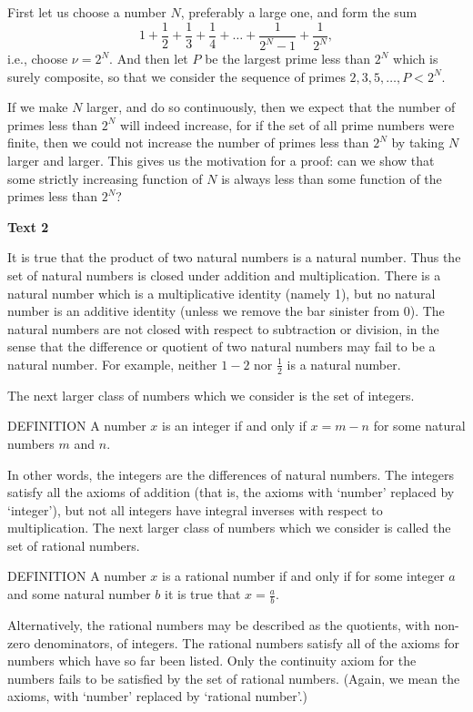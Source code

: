 \documentclass[a4paper]{article}
\newcommand{\ESect}[1]{\medskip\par{\large \textbf{#1}}\par}
\begin{document}
First let us choose a number $N$, preferably a large one, and form the sum
$$1+\frac{1}{2}+\frac{1}{3}+\frac{1}{4}+\ldots+\frac{1}{2^N-1}+\frac{1}{2^N},$$
i.e., choose $\nu=2^N$. And then let $P$ be the largest prime less than $2^N$ which is surely composite, so that we consider
the sequence of primes $2,3,5, \ldots, P < 2^N$.

If we make $N$ larger, and do so continuously, then we expect that the number of primes less than $2^N$ will indeed increase,
for if the set of all prime numbers were finite, then we could not increase the number of primes less than $2^N$ by taking $N$
larger and larger. This gives us the motivation for a proof: can we show that some strictly increasing function of $N$ is always
less than some function of the primes less than $2^N$?

\ESect{Text 2}
It is true that the product of two natural numbers is a natural number. Thus the set of natural numbers is closed under addition
and multiplication. There is a natural number which is a multiplicative identity (namely 1), but no natural number is an additive
identity (unless we remove the bar sinister from 0). The natural numbers are not closed with respect to subtraction or division,
in the sense that the difference or quotient of two natural numbers may fail to be a natural number. For example, neither
$1 - 2$ nor $\frac{1}{2}$ is a natural number.

The next larger class of numbers which we consider is the set of integers.

DEFINITION A number $x$ is an integer if and only if $x = m - n$ for some natural numbers $m$ and $n$.

In other words, the integers are the differences of natural numbers. The integers satisfy all the axioms of addition (that
is, the axioms with `number' replaced by `integer'), but not all integers have integral inverses with respect to multiplication.
The next larger class of numbers which we consider is called the set of rational numbers.

DEFINITION A number $x$ is a rational number if and only if for some integer $a$ and some natural number $b$ it is true that
$x = \frac{a}{b}$.

Alternatively, the rational numbers may be described as the quotients, with non-zero denominators, of integers.
The rational numbers satisfy all of the axioms for numbers which have so far been listed. Only the continuity axiom for the
numbers fails to be satisfied by the set of rational numbers. (Again, we mean the axioms, with `number' replaced by `rational number'.)
\end{document}
